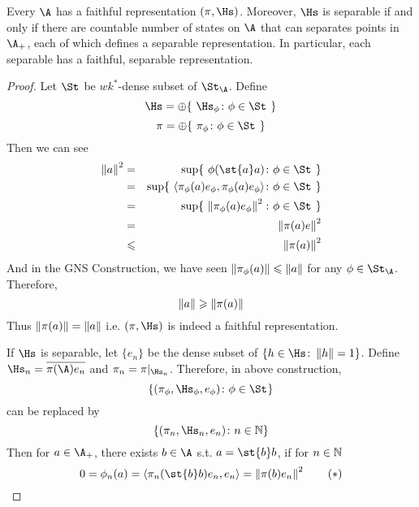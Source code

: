 \begin{thm}
	Every \Cs $\A$ has a faithful representation $(\pi,\Hs)$. Moreover, $\Hs$ is separable if and only if there are countable number of states on $\A$ that can separates points in $\A_{+}$, each of which defines a separable representation. In particular, each separable \Cs has a faithful, separable representation.
\end{thm}
\begin{proof}
	Let $\St_{}$ be $wk^{*}$-dense subset of $\St_{\A}$. Define
	\begin{equation*}
		\Hs = \oplus \{~\Hs_{\phi} \colon \phi \in \St_{}~\}
	\end{equation*} 
	\begin{equation*}
		\pi = \oplus \{~\pi_{\phi} \colon \phi \in \St_{}~\}
	\end{equation*}
	Then we can see
	\begin{eqnarray*}
		\norm{a}^2 &=& \sup \{~\phi(\st{a}a) \colon \phi \in \St_{}~\}\\ 
		&=& \sup \{~\langle \pi_{\phi}(a)e_{\phi},\pi_{\phi}(a)e_{\phi} \rangle \colon \phi \in \St_{}~\} \\
		&=& \sup \{~\norm{\pi_{\phi}(a)e_{\phi}}^2 \colon \phi \in \St_{}~\} \\
		&=&	\norm{\pi(a)e}^2\\
		&\leqslant& \norm{\pi(a)}^2
	\end{eqnarray*}
	And in the GNS Construction, we have seen $\left\lVert\pi_{\phi}(a)\right\lVert \leqslant \left\lVert a\right\lVert$ for any $\phi \in \St_{\A}$. Therefore,
	\begin{equation*}
		\left\lVert a\right\lVert \geqslant \left\lVert\pi(a)\right\lVert
	\end{equation*}
	Thus $\left\lVert\pi(a)\right\lVert = \left\lVert a\right\lVert$ i.e. $(\pi,\Hs)$ is indeed a faithful representation.
	\item If $\Hs$ is separable, let $\{e_n\}$ be the dense subset of $\{h \in \Hs \colon \norm{h} =1\}$. Define $\Hs_n = \clo{\pi(\A)e_n}$ and $\pi_n = \pi|_{\Hs_n}$. Therefore, in above construction,
	\begin{equation*}
		\{(\pi_{\phi},\Hs_{\phi},e_{\phi}) \colon \phi \in \St_{}\}
	\end{equation*}
	can be replaced by
	\begin{equation*}
		\{(\pi_n,\Hs_n,e_n) \colon n \in \N\}
	\end{equation*}
	Then for $a \in \A_{+}$, there exists $b \in \A$ s.t. $a = \st{b}b$, if for $n \in \mathbb{N}$
	\begin{equation}
		0=\phi_n(a) = \langle \pi_n(\st{b}b)e_n,e_n \rangle = \norm{\pi(b)e_n}^2 \tag{$*$}

\end{equation}
\end{proof}
